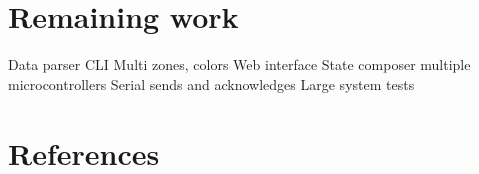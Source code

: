 \documentclass[onecolumn, draftclsnofoot,10pt, compsoc]{IEEEtran}
\begin{document}
	\section{Remaining work}
	Data parser
	CLI Multi zones, colors
	Web interface
	State composer multiple microcontrollers
	Serial sends and acknowledges
	Large system tests


	\section{References}
			\begingroup
				\renewcommand{\addcontentsline}[3]{}%
				\renewcommand{\section}[2]{}%
				
				
			\endgroup
\end{document}
